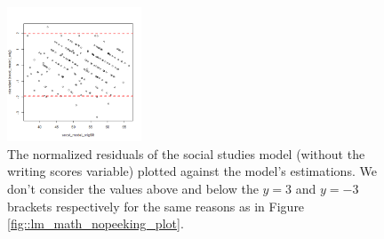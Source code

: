 \documentclass[10pt, a4paper]{article}
\begin{document}
	 \begin{figure}
	 	\includegraphics[width=4cm]{lm_socst_residual_plot.png}
	 	\centering
	 	\caption{The normalized residuals of the social studies model (without the writing scores variable) plotted against the model's estimations. We don't consider the values above and below the $y=3$ and $y=-3$ brackets respectively for the same reasons as in Figure \ref{fig::lm_math_nopeeking_plot}.}
	 	\label{fig::lm_sosct_nopeeking_plot}
	 \end{figure}
	
\end{document}

